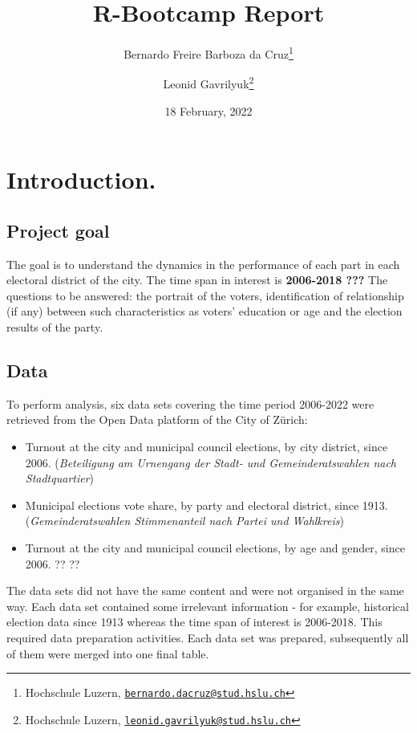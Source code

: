 \documentclass[
]{article}
\title{R-Bootcamp Report}
\author{Bernardo Freire Barboza da Cruz\footnote{Hochschule Luzern,
  \href{mailto:bernardo.dacruz@stud.hslu.ch}{\nolinkurl{bernardo.dacruz@stud.hslu.ch}}} \and Leonid
Gavrilyuk\footnote{Hochschule Luzern,
  \href{mailto:leonid.gavrilyuk@stud.hslu.ch}{\nolinkurl{leonid.gavrilyuk@stud.hslu.ch}}}}
\date{18 February, 2022}
\providecommand{\tightlist}{%
  \setlength{\itemsep}{0pt}\setlength{\parskip}{0pt}}
\begin{document}
\maketitle

\centering
\raggedright
\newpage
\tableofcontents
\pagebreak

\hypertarget{introduction.}{%
\section{Introduction.}\label{introduction.}}

\hypertarget{project-goal}{%
\subsection{Project goal}\label{project-goal}}

The goal is to understand the dynamics in the performance of each part
in each electoral district of the city. The time span in interest is
\textbf{2006-2018 ???} The questions to be answered: the portrait of the
voters, identification of relationship (if any) between such
characteristics as voters' education or age and the election results of
the party.

\hypertarget{data}{%
\subsection{Data}\label{data}}

To perform analysis, six data sets covering the time period 2006-2022
were retrieved from the Open Data platform of the City of Zürich:

\begin{itemize}
\tightlist
\item
  Turnout at the city and municipal council elections, by city district,
  since 2006. (\emph{Beteiligung am Urnengang der Stadt- und
  Gemeinderatswahlen nach Stadtquartier})
\item
  Municipal elections vote share, by party and electoral district, since
  1913. (\emph{Gemeinderatswahlen Stimmenanteil nach Partei und
  Wahlkreis})
\item
  Turnout at the city and municipal council elections, by age and
  gender, since 2006. ?? ??
\end{itemize}

The data sets did not have the same content and were not organised in
the same way. Each data set contained some irrelevant information - for
example, historical election data since 1913 whereas the time span of
interest is 2006-2018. This required data preparation activities. Each
data set was prepared, subsequently all of them were merged into one
final table.
\end{document}
